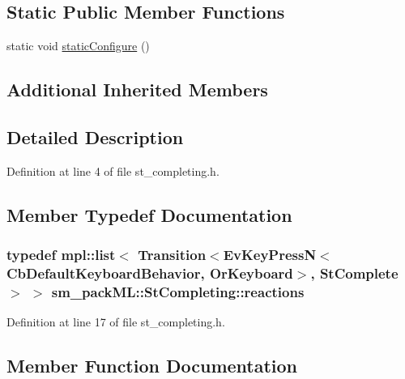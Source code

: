 \subsection*{Static Public Member Functions}
\begin{DoxyCompactItemize}
\item 
static void \hyperlink{structsm__packML_1_1StCompleting_a67bbe8665dd9e951fb6c3c537a984d9b}{static\+Configure} ()
\end{DoxyCompactItemize}
\subsection*{Additional Inherited Members}


\subsection{Detailed Description}


Definition at line 4 of file st\+\_\+completing.\+h.



\subsection{Member Typedef Documentation}
\subsubsection[{\texorpdfstring{reactions}{reactions}}]{\setlength{\rightskip}{0pt plus 5cm}typedef mpl\+::list$<$ Transition$<$Ev\+Key\+PressN$<$Cb\+Default\+Keyboard\+Behavior, {\bf Or\+Keyboard}$>$, {\bf St\+Complete}$>$ $>$ {\bf sm\+\_\+pack\+M\+L\+::\+St\+Completing\+::reactions}}\hypertarget{structsm__packML_1_1StCompleting_a081e556c39a3231f8a94a092c5b07583}{}\label{structsm__packML_1_1StCompleting_a081e556c39a3231f8a94a092c5b07583}


Definition at line 17 of file st\+\_\+completing.\+h.



\subsection{Member Function Documentation}
